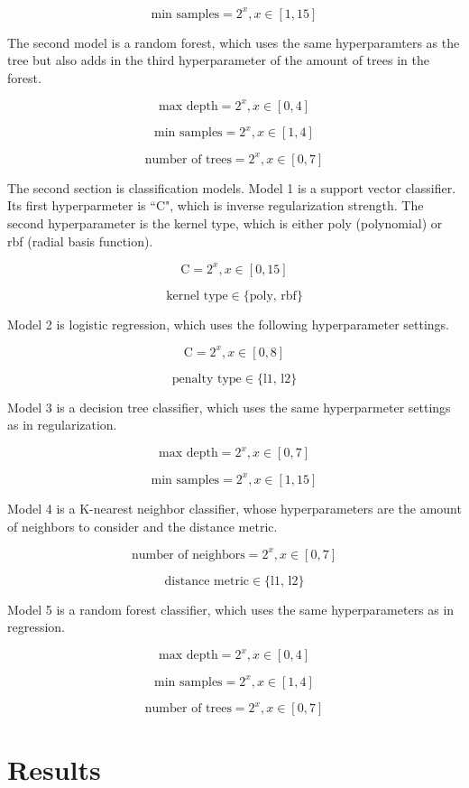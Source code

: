 \documentclass[12pt, letterpaper]{article}
\begin{document}
$$
\text{min samples} = 2^x, x \in [1,15]
$$

The second model is a random forest, which uses the same hyperparamters as the tree but also adds in the third hyperparameter of the amount of trees in the forest.

$$
\text{max depth} = 2^x, x \in [0,4]
$$

$$
\text{min samples} = 2^x, x \in [1,4]
$$

$$
\text{number of trees} = 2^x, x \in [0,7]
$$

The second section is classification models. Model 1 is a support vector classifier. Its first hyperparmeter is ``C", which is inverse regularization strength. The second hyperparameter is the kernel type, which is either poly (polynomial) or rbf (radial basis function).

$$
\text{C} = 2^x, x \in [0,15]
$$

$$
\text{kernel type} \in \{\text{poly, rbf}\}
$$

Model 2 is logistic regression, which uses the following hyperparameter settings.

$$
\text{C} = 2^x, x \in [0,8]
$$

$$
\text{penalty type} \in \{\text{l1, l2}\}
$$

Model 3 is a decision tree classifier, which uses the same hyperparmeter settings as in regularization.

$$
\text{max depth} = 2^x, x \in [0,7]
$$

$$
\text{min samples} = 2^x, x \in [1,15]
$$

Model 4 is a K-nearest neighbor classifier, whose hyperparameters are the amount of neighbors to consider and the distance metric.

$$
\text{number of neighbors} = 2^x, x \in [0,7]
$$

$$
\text{distance metric} \in \{\text{l1, l2}\}
$$

Model 5 is a random forest classifier, which uses the same hyperparameters as in regression.

$$
\text{max depth} = 2^x, x \in [0,4]
$$

$$
\text{min samples} = 2^x, x \in [1,4]
$$

$$
\text{number of trees} = 2^x, x \in [0,7]
$$

\section{Results} %
\end{document}
